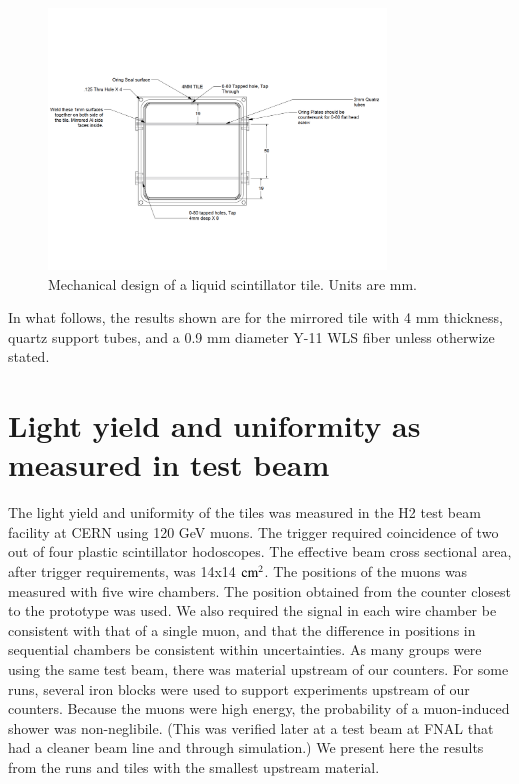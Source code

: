 \documentclass[review]{elsarticle}
\begin{document}
\begin{figure}[!ht]
\begin{center}
\includegraphics[width=0.8\textwidth]{./figures/mechanicaldesign.pdf}
\caption{Mechanical design of a liquid scintillator tile.  Units are
  mm.  }
\label{fig:tiledesign}
\end{center}
\end{figure}

In what follows, the results shown are for the mirrored tile with 4 mm
thickness, quartz support tubes, and a 0.9 mm diameter Y-11 WLS fiber
unless otherwize stated.

\section{Light yield and uniformity as measured in test beam}

The light yield and uniformity of the tiles was measured in the H2
test beam facility at CERN using 120 GeV muons.  The trigger required
coincidence of two out of four plastic scintillator hodoscopes. The
effective beam cross sectional area, after trigger requirements, was
14x14 ${\rm cm^2}$. The positions of the muons was measured with five
wire chambers. The position obtained from the counter closest to the
prototype was used.  We also required the signal in each wire chamber
be consistent with that of a single muon, and that the difference in
positions in sequential chambers be consistent within uncertainties.
As many groups were using the same test beam, there was material
upstream of our counters.  For some runs, several iron blocks were
used to support experiments upstream of our counters.  Because the
muons were high energy, the probability of a muon-induced shower was
non-neglibile.  (This was verified later at a test beam at FNAL that
had a cleaner beam line and through simulation.)  We present here the
results from the runs and tiles with the smallest upstream material.
\end{document}
